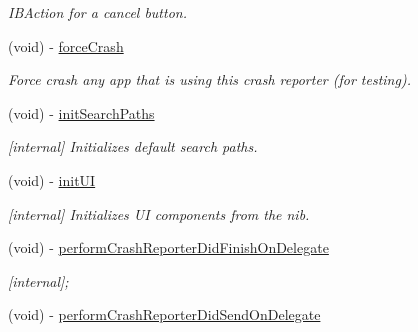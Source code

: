 \begin{DoxyCompactItemize}
\begin{DoxyCompactList}\small\item\em IBAction for a cancel button. \item\end{DoxyCompactList}\item 
\hypertarget{interface_g_d_crash_reporter_a158c55e9fcb94a54f9acdce4e7a5f4b3}{
(void) -\/ \hyperlink{interface_g_d_crash_reporter_a158c55e9fcb94a54f9acdce4e7a5f4b3}{forceCrash}}
\label{interface_g_d_crash_reporter_a158c55e9fcb94a54f9acdce4e7a5f4b3}

\begin{DoxyCompactList}\small\item\em Force crash any app that is using this crash reporter (for testing). \item\end{DoxyCompactList}\item 
\hypertarget{interface_g_d_crash_reporter_a82f5c0d8a23756974dc1e785f35c3d80}{
(void) -\/ \hyperlink{interface_g_d_crash_reporter_a82f5c0d8a23756974dc1e785f35c3d80}{initSearchPaths}}
\label{interface_g_d_crash_reporter_a82f5c0d8a23756974dc1e785f35c3d80}

\begin{DoxyCompactList}\small\item\em \mbox{[}internal\mbox{]} Initializes default search paths. \item\end{DoxyCompactList}\item 
\hypertarget{interface_g_d_crash_reporter_a4a47e15671fdce961d8a0e6d8f2f8fe2}{
(void) -\/ \hyperlink{interface_g_d_crash_reporter_a4a47e15671fdce961d8a0e6d8f2f8fe2}{initUI}}
\label{interface_g_d_crash_reporter_a4a47e15671fdce961d8a0e6d8f2f8fe2}

\begin{DoxyCompactList}\small\item\em \mbox{[}internal\mbox{]} Initializes UI components from the nib. \item\end{DoxyCompactList}\item 
\hypertarget{interface_g_d_crash_reporter_a7b264001f728746dc5e6305552941c8d}{
(void) -\/ \hyperlink{interface_g_d_crash_reporter_a7b264001f728746dc5e6305552941c8d}{performCrashReporterDidFinishOnDelegate}}
\label{interface_g_d_crash_reporter_a7b264001f728746dc5e6305552941c8d}

\begin{DoxyCompactList}\small\item\em \mbox{[}internal\mbox{]}; \item\end{DoxyCompactList}\item 
\hypertarget{interface_g_d_crash_reporter_af0f657c24d0664dee501add962783021}{
(void) -\/ \hyperlink{interface_g_d_crash_reporter_af0f657c24d0664dee501add962783021}{performCrashReporterDidSendOnDelegate}}
\label{interface_g_d_crash_reporter_af0f657c24d0664dee501add962783021}


\end{DoxyCompactItemize}
